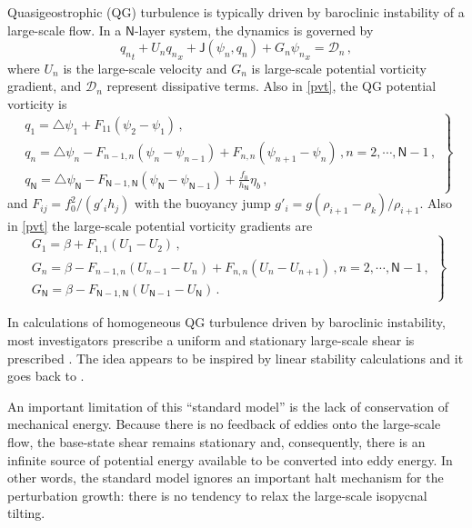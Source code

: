 \documentclass{jfm}
\def\beq{\begin{equation}}
\def\eeq{\end{equation}}
\newcommand{\com}{\, ,}
\newcommand{\per}{\, .}
\newcommand{\lap}{\triangle}
\newcommand{\nmax}{\mathsf{N}}
\newcommand{\jacob}[2]{\mathsf{J}(#1,#2)}
\newcommand{\diss}{\mathcal{D}}
\begin{document}
Quasigeostrophic (QG) turbulence is typically driven by baroclinic instability
of a large-scale flow. In a $\nmax$-layer system, the dynamics is governed by
\beq \label{pvt}
{q_n}_t + U_n {q_n}_x + \jacob{\psi_n}{q_n} + G_n {\psi_n}_x = \diss_n \com
\eeq
where $U_n$ is the large-scale velocity and $G_n$ is large-scale potential
vorticity gradient, and $\diss_n$ represent dissipative terms.
Also in \eqref{pvt}, the QG potential vorticity is
\begin{equation}
\left. \begin{array}{l}
\displaystyle
   \label{pv}
   {q_1} = \lap\psi_1 + F_{11} \left(\psi_{2}-\psi_1\right)\com \\
   {q_n} = \lap\psi_n - F_{n-1,n} \left(\psi_{n}-\psi_{n-1}\right) +
           F_{n,n}\left(\psi_{n+1}-\psi_{n}\right) \com  n=2,\cdots,\nmax-1\com \\
    {q_{\nmax}} = \lap\psi_{\nmax} - F_{{\nmax}-1,{\nmax}}\left(\psi_{{\nmax}}-
    \psi_{\nmax-1}
    \right) + \frac{f_0}{h_{\nmax}}\eta_b \com
\end{array} \right\}
\end{equation}
and $F_{ij} = f_0^2/(g'_i h_j)$ with the buoyancy jump $g'_i =
g (\rho_{i+1}-\rho_k)/\rho_{i+1}$.
Also in \eqref{pvt} the large-scale potential vorticity gradients are
\beq \label{Gn}
\left. \begin{array}{l}
G_1 = \beta + F_{1,1}(U_1-U_2)\com\\
G_n = \beta - F_{n-1,n}(U_{n-1}-U_n) + F_{n,n}(U_n-U_{n+1})\com n=2,\cdots,\nmax-1
\com\\
G_\nmax = \beta - F_{\nmax-1,\nmax}(U_{\nmax-1}-U_\nmax)\per
\end{array} \right\}
\eeq


In calculations of homogeneous QG turbulence driven by baroclinic instability,
most investigators prescribe a uniform and stationary large-scale shear is
prescribed \citep[e.g.,][]{haidvogel_held1980,thompson_young2007}. The idea appears
to be inspired by linear stability calculations and it goes back to
\cite{bretherton_karweit1975}.

An important limitation of this ``standard model'' is the lack of conservation
of mechanical energy. Because there is no feedback of eddies onto the large-scale
flow, the base-state shear remains stationary and, consequently, there is an
infinite source of potential energy available to be converted into eddy energy.
In other words, the standard model ignores an important halt mechanism for the
perturbation growth: there is no tendency to relax the large-scale isopycnal
tilting.
\end{document}
